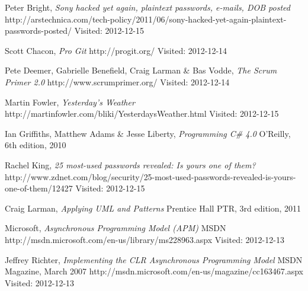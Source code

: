 
\begin{thebibliography}{99}
		
		Peter Bright,
		\emph{Sony hacked yet again, plaintext passwords, e-mails, DOB posted}\newline
		http://arstechnica.com/tech-policy/2011/06/sony-hacked-yet-again-plaintext-passwords-posted/\newline
		Visited: 2012-12-15
		
		Scott Chacon,
		\emph{Pro Git}\newline
		http://progit.org/\newline
		Visited: 2012-12-14

		Pete Deemer, Gabrielle Benefield, Craig Larman \& Bas Vodde,
		\emph{The Scrum Primer 2.0}\newline
		http://www.scrumprimer.org/\newline
		Visited: 2012-12-14
			
		Martin Fowler,
		\emph{Yesterday's Weather}\newline
		http://martinfowler.com/bliki/YesterdaysWeather.html\newline
		Visited: 2012-12-15

		Ian Griffiths, Matthew Adams \& Jesse Liberty,
		\emph{Programming C\# 4.0}\newline
		O'Reilly, 6th edition, 2010
	
		Rachel King,
		\emph{25 most-used passwords revealed: Is yours one of them?}\newline
		http://www.zdnet.com/blog/security/25-most-used-passwords-revealed-is-yours-one-of-them/12427\newline
		Visited: 2012-12-15
		
		Craig Larman,
		\emph{Applying UML and Patterns}\newline
		Prentice Hall PTR, 3rd edition, 2011

		Microsoft,
		\emph{Asynchronous Programming Model (APM)}\newline
		MSDN\newline
		http://msdn.microsoft.com/en-us/library/ms228963.aspx\newline
		Visited: 2012-12-13
	
		Jeffrey Richter,
		\emph{Implementing the CLR Asynchronous Programming Model}\newline
		MSDN Magazine,
		March 2007\newline
		http://msdn.microsoft.com/en-us/magazine/cc163467.aspx\newline
		Visited: 2012-12-13
		

\end{thebibliography}

